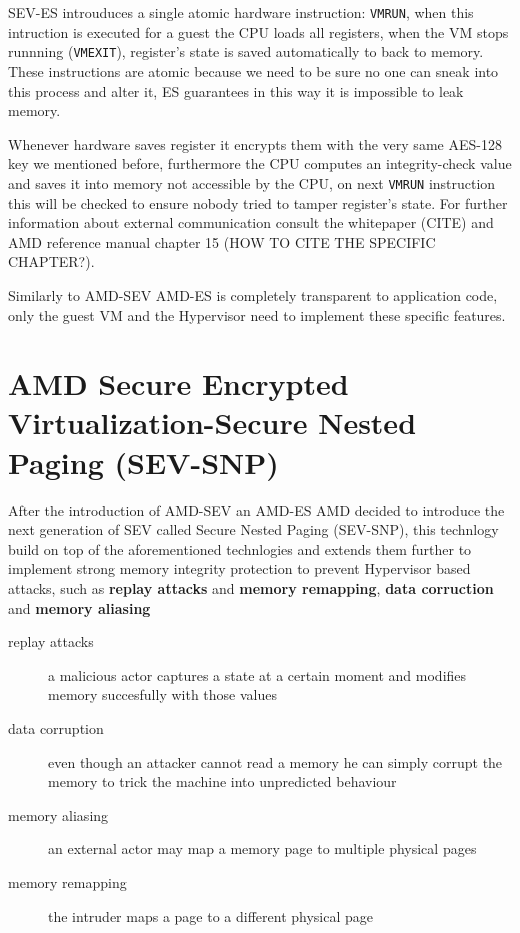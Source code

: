 \documentclass[twocolumn]{article}
\begin{document}
SEV-ES introuduces a single atomic hardware instruction: \texttt{VMRUN}, when this intruction is executed for a guest the CPU loads all registers, when the VM stops runnning (\texttt{VMEXIT}), register's state is saved automatically to  back to memory. These instructions are atomic because we need to be sure no one can sneak into this process and alter it, ES guarantees in this way it is impossible to leak memory.

Whenever hardware saves register it encrypts them with the very same AES-128 key we mentioned before, furthermore the CPU computes an integrity-check value and saves it into memory not accessible by the CPU, on next \texttt{VMRUN} instruction this will be checked to ensure nobody tried to tamper register's state. For further information about external communication consult the whitepaper (CITE) and AMD reference manual chapter 15 (HOW TO CITE THE SPECIFIC CHAPTER?).

Similarly to AMD-SEV AMD-ES is completely transparent to application code, only the guest VM and the Hypervisor need to implement these specific features.

\section{AMD Secure Encrypted Virtualization-Secure Nested Paging (SEV-SNP)}

After the introduction of AMD-SEV an AMD-ES AMD decided to introduce the next generation of SEV called Secure Nested Paging (SEV-SNP), this technlogy build on top of the aforementioned technlogies and extends them further to implement strong memory integrity protection to prevent Hypervisor based attacks, such as \textbf{replay attacks} and \textbf{memory remapping}, \textbf{data corruction} and \textbf{memory aliasing}

\begin{description}
    \item[replay attacks] a malicious actor captures a state at a certain moment and modifies memory succesfully with those values
    \item[data corruption]  even though an attacker cannot read a memory he can simply corrupt the memory to trick the machine into unpredicted behaviour
    \item[memory aliasing]  an external actor may map a memory page to multiple physical pages
    \item[memory remapping]  the intruder maps a page to a different physical page
\end{description}
\end{document}
